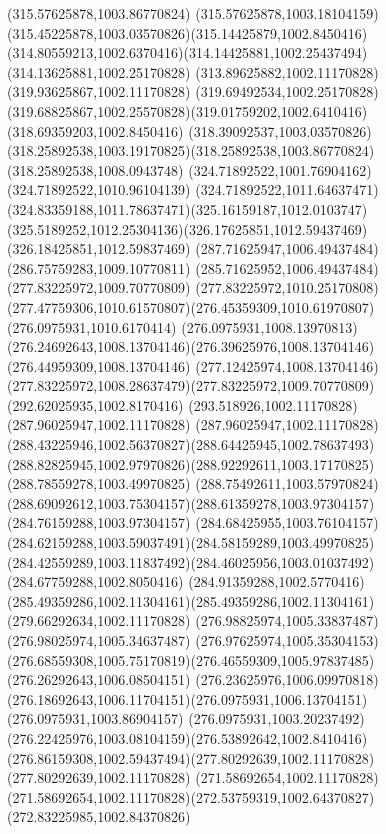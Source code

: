 {{\lineto(315.57625878,1003.86770824)
\curveto(315.57625878,1003.18104159)(315.45225878,1003.03570826)(315.14425879,1002.8450416)
\curveto(314.80559213,1002.6370416)(314.14425881,1002.25437494)(314.13625881,1002.25170828)
\lineto(313.89625882,1002.11170828)
\lineto(319.93625867,1002.11170828)
\lineto(319.69492534,1002.25170828)
\curveto(319.68825867,1002.25570828)(319.01759202,1002.6410416)(318.69359203,1002.8450416)
\curveto(318.39092537,1003.03570826)(318.25892538,1003.19170825)(318.25892538,1003.86770824)
\lineto(318.25892538,1008.0943748)
\lineto(324.71892522,1001.76904162)
\lineto(324.71892522,1010.96104139)
\curveto(324.71892522,1011.64637471)(324.83359188,1011.78637471)(325.16159187,1012.0103747)
\curveto(325.5189252,1012.25304136)(326.17625851,1012.59437469)(326.18425851,1012.59837469)
\closepath
\moveto(287.71625947,1006.49437484)
\lineto(286.75759283,1009.10770811)
\lineto(285.71625952,1006.49437484)
\closepath
\moveto(277.83225972,1009.70770809)
\curveto(277.83225972,1010.25170808)(277.47759306,1010.61570807)(276.45359309,1010.61970807)
\lineto(276.0975931,1010.6170414)
\lineto(276.0975931,1008.13970813)
\curveto(276.24692643,1008.13704146)(276.39625976,1008.13704146)(276.44959309,1008.13704146)
\curveto(277.12425974,1008.13704146)(277.83225972,1008.28637479)(277.83225972,1009.70770809)
\moveto(292.62025935,1002.8170416)
\lineto(293.518926,1002.11170828)
\lineto(287.96025947,1002.11170828)
\curveto(287.96025947,1002.11170828)(288.43225946,1002.56370827)(288.64425945,1002.78637493)
\curveto(288.82825945,1002.97970826)(288.92292611,1003.17170825)(288.78559278,1003.49970825)
\curveto(288.75492611,1003.57970824)(288.69092612,1003.75304157)(288.61359278,1003.97304157)
\lineto(284.76159288,1003.97304157)
\curveto(284.68425955,1003.76104157)(284.62159288,1003.59037491)(284.58159289,1003.49970825)
\curveto(284.42559289,1003.11837492)(284.46025956,1003.01037492)(284.67759288,1002.8050416)
\curveto(284.91359288,1002.5770416)(285.49359286,1002.11304161)(285.49359286,1002.11304161)
\lineto(279.66292634,1002.11170828)
\lineto(276.98825974,1005.33837487)
\lineto(276.98025974,1005.34637487)
\lineto(276.97625974,1005.35304153)
\curveto(276.68559308,1005.75170819)(276.46559309,1005.97837485)(276.26292643,1006.08504151)
\curveto(276.23625976,1006.09970818)(276.18692643,1006.11704151)(276.0975931,1006.13704151)
\lineto(276.0975931,1003.86904157)
\curveto(276.0975931,1003.20237492)(276.22425976,1003.08104159)(276.53892642,1002.8410416)
\curveto(276.86159308,1002.59437494)(277.80292639,1002.11170828)(277.80292639,1002.11170828)
\lineto(271.58692654,1002.11170828)
\curveto(271.58692654,1002.11170828)(272.53759319,1002.64370827)(272.83225985,1002.84370826)
}}
